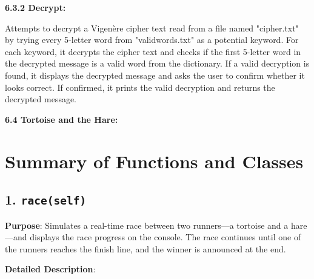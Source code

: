 \begin{homeworkProblem}

	{\Large\textbf{6.3.2 Decrypt:}}

	Attempts to decrypt a Vigenère cipher text read from a file named "cipher.txt" by trying every 5-letter word from "validwords.txt" as a potential keyword. For each keyword, it decrypts the cipher text and checks if the first 5-letter word in the decrypted message is a valid word from the dictionary. If a valid decryption is found, it displays the decrypted message and asks the user to confirm whether it looks correct. If confirmed, it prints the valid decryption and returns the decrypted message.

\end{homeworkProblem}

\begin{homeworkProblem}

	{\Large\textbf{6.4 Tortoise and the Hare:}}

\section*{Summary of Functions and Classes}

\subsection*{1. \texttt{race(self)}}

\textbf{Purpose}: Simulates a real-time race between two runners—a tortoise and a hare—and displays the race progress on the console. The race continues until one of the runners reaches the finish line, and the winner is announced at the end.

\textbf{Detailed Description}:


\end{homeworkProblem}
